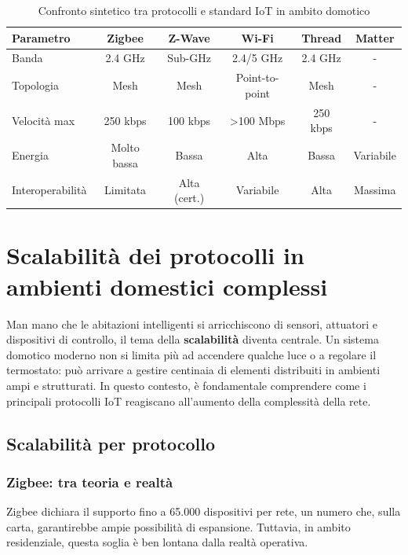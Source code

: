 \begin{table}[htbp]
\centering
\begin{tabular}{|l|c|c|c|c|c|}
\hline
\textbf{Parametro} & \textbf{Zigbee} & \textbf{Z-Wave} & \textbf{Wi-Fi} & \textbf{Thread} & \textbf{Matter} \\
\hline
Banda & 2.4 GHz & Sub-GHz & 2.4/5 GHz & 2.4 GHz & - \\
Topologia & Mesh & Mesh & Point-to-point & Mesh & - \\
Velocità max & 250 kbps & 100 kbps & \textgreater100 Mbps & 250 kbps & - \\
Energia & Molto bassa & Bassa & Alta & Bassa & Variabile \\
Interoperabilità & Limitata & Alta (cert.) & Variabile & Alta & Massima \\
\hline
\end{tabular}
\caption{Confronto sintetico tra protocolli e standard IoT in ambito domotico}
\label{tab:confronto-protocolli}
\end{table}

\section{Scalabilità dei protocolli in ambienti domestici complessi}

Man mano che le abitazioni intelligenti si arricchiscono di sensori, attuatori e dispositivi di controllo, il tema della \textbf{scalabilità} diventa centrale. Un sistema domotico moderno non si limita più ad accendere qualche luce o a regolare il termostato: può arrivare a gestire centinaia di elementi distribuiti in ambienti ampi e strutturati. In questo contesto, è fondamentale comprendere come i principali protocolli IoT reagiscano all’aumento della complessità della rete.

\subsection{Scalabilità per protocollo}

\subsubsection{Zigbee: tra teoria e realtà}

Zigbee dichiara il supporto fino a 65.000 dispositivi per rete, un numero che, sulla carta, garantirebbe ampie possibilità di espansione. Tuttavia, in ambito residenziale, questa soglia è ben lontana dalla realtà operativa.

